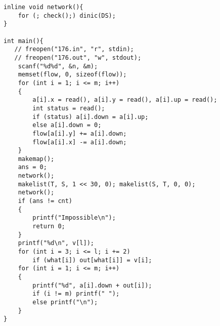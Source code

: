 \begin{lstlisting}
inline void network(){
    for (; check();) dinic(DS);
}

int main(){
   // freopen("176.in", "r", stdin);
   // freopen("176.out", "w", stdout);
    scanf("%d%d", &n, &m);
    memset(flow, 0, sizeof(flow));    
    for (int i = 1; i <= m; i++) 
    {
        a[i].x = read(), a[i].y = read(), a[i].up = read();
        int status = read();
        if (status) a[i].down = a[i].up;
        else a[i].down = 0;
        flow[a[i].y] += a[i].down;
        flow[a[i].x] -= a[i].down;
    }
    makemap();
    ans = 0;
    network();
    makelist(T, S, 1 << 30, 0); makelist(S, T, 0, 0);
    network();
    if (ans != cnt) 
    {
        printf("Impossible\n");
        return 0;
    }
    printf("%d\n", v[l]);
    for (int i = 3; i <= l; i += 2)
        if (what[i]) out[what[i]] = v[i];
    for (int i = 1; i <= m; i++) 
    {
        printf("%d", a[i].down + out[i]);
        if (i != m) printf(" ");
        else printf("\n");
    }
}
\end{lstlisting}
